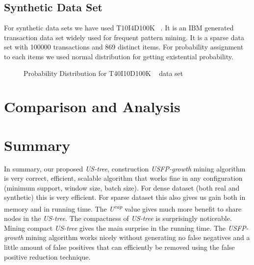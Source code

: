 \subsection{Synthetic Data Set}
For synthetic data sets we have used T10I4D100K ~\cite{dataset}. It is an IBM generated transaction data set widely used for frequent pattern mining. It is a sparse data set with 100000 transactions and 869 distinct items. For probability assignment to each items we used normal distribution for getting existential probability.
		\begin{figure}[h]
		\centering
			
		\caption{Probability Distribution for T40I10D100K ~\cite{dataset} data set}
		\label{result:g_dataset_t10}
		\end{figure}
		
		
\clearpage
\section{Comparison and Analysis}
	

\clearpage
\section{Summary}
In summary, our proposed \emph{US-tree}, construction \emph{USFP-growth} mining algorithm is very correct, efficient, scalable algorithm that works fine in any configuration (minimum support, window size, batch size). For dense dataset (both real and synthetic) this is very efficient. For sparse dataset this also gives us gain both in memory and in running time. The \emph{U\textsuperscript{cap}} value gives much more benefit to share nodes in the \emph{US-tree}. The compactness of \emph{US-tree} is surprisingly noticeable. Mining compact \emph{US-tree} gives the main surprise in the running time. The \emph{USFP-growth} mining algorithm works nicely without generating no false negatives and a little amount of false positives that can efficiently be removed using the false positive reduction technique.
%
%